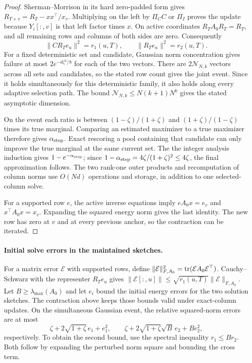 \begin{proof}
Sherman--Morrison in its hard zero-padded form gives
$R_{T+v}=R_T-xx^\top/x_v$. Multiplying on the left by $\Pi_C C$ or
$\Pi_I$ proves the update because $Y_i[:,v]$ is that left factor
times $x$. On active coordinates $R_TA_0R_T=R_T$, and all
remaining rows and columns of both sides are zero. Consequently
\[
 \|CR_Te_u\|^2=r_1(u,T),\qquad
 \|R_Te_u\|^2=r_2(u,T).
\]
For a fixed deterministic set and candidate, Gaussian norm
concentration gives failure at most $2e^{-d\zeta^2/8}$ for each
of the two vectors. There are $2\mathcal N_{N,k}$ vectors across all sets and
candidates, so the stated row count gives the joint event.
Since it holds simultaneously for this deterministic family,
it also holds along every adaptive selection path. The bound
$\mathcal N_{N,k}\leq N(k+1)N^k$ gives the stated asymptotic dimension.

On the event each ratio is between $(1-\zeta)/(1+\zeta)$ and
$(1+\zeta)/(1-\zeta)$ times its true marginal. Comparing an
estimated maximizer to a true maximizer therefore gives $\alpha_{\rm step}$.
Exact rescoring a pool containing that candidate can only improve
the true marginal at the same current set. The the integer analysis induction gives
$1-e^{-\alpha_{\rm step}}$; since $1-\alpha_{\rm step}=4\zeta/(1+\zeta)^2\leq4\zeta$,
the final approximation follows. The two rank-one outer products
and recomputation of column norms use $O(Nd)$ operations and
storage, in addition to one selected-column solve.

For a supported row $e$, the active inverse equations imply
$eA_0x=e_v$ and $x^\top A_0x=x_v$. Expanding the squared energy
norm gives the last identity. The new row has zero at $v$ and
at every previous anchor, so the contraction can be iterated.
\end{proof}

\paragraph{Initial solve errors in the maintained sketches.}
For a matrix error $\mathcal E$ with supported rows, define
$\|\mathcal E\|_{F,A_0}^2=\operatorname{tr}(\mathcal E A_0\mathcal E^\top)$.
Cauchy--Schwarz with the representer $R_Te_u$ gives
$\|\mathcal E[:,u]\|\leq\sqrt{r_1(u,T)}\|\mathcal E\|_{F,A_0}$.
Let $B\geq\lambda_{\max}(A_0)$ and let $e_i$ bound the initial
energy errors for the two solution sketches. The contraction above
keeps those bounds valid under exact-column updates. On the
simultaneous Gaussian event, the relative squared-norm errors
are at most
\[
 \zeta+2\sqrt{1+\zeta}\,e_1+e_1^2,
 \qquad
 \zeta+2\sqrt{1+\zeta}\sqrt B\,e_2+B e_2^2,
\]
respectively. To obtain the second bound, use the spectral
inequality $r_1\leq B r_2$. Both follow by expanding the
perturbed norm square and bounding the cross term. 



